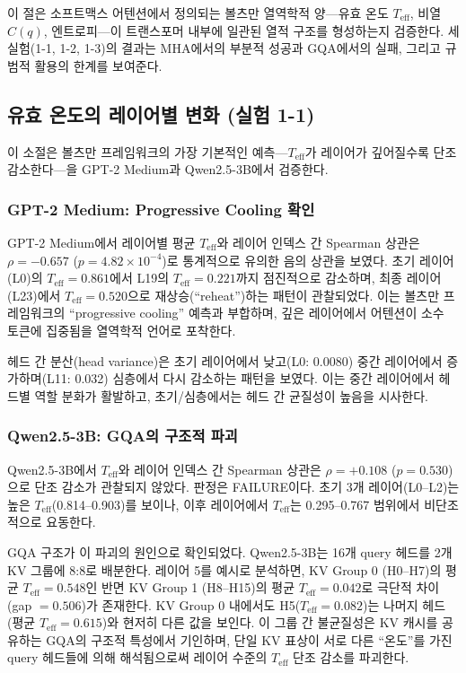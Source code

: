 \documentclass[11pt,a4paper]{article}
\newcommand{\teff}{T_\mathrm{eff}}
\newcommand{\Cq}{C(q)}
\begin{document}
이 절은 소프트맥스 어텐션에서 정의되는 볼츠만 열역학적 양---유효 온도 $\teff$, 비열 $\Cq$, 엔트로피---이 트랜스포머 내부에 일관된 열적 구조를 형성하는지 검증한다. 세 실험(1-1, 1-2, 1-3)의 결과는 MHA에서의 부분적 성공과 GQA에서의 실패, 그리고 규범적 활용의 한계를 보여준다.

\subsection{유효 온도의 레이어별 변화 (실험 1-1)}

이 소절은 볼츠만 프레임워크의 가장 기본적인 예측---$\teff$가 레이어가 깊어질수록 단조 감소한다---을 GPT-2 Medium과 Qwen2.5-3B에서 검증한다.

\subsubsection{GPT-2 Medium: Progressive Cooling 확인}

GPT-2 Medium에서 레이어별 평균 $\teff$와 레이어 인덱스 간 Spearman 상관은 $\rho = -0.657$ ($p = 4.82 \times 10^{-4}$)로 통계적으로 유의한 음의 상관을 보였다. 초기 레이어(L0)의 $\teff = 0.861$에서 L19의 $\teff = 0.221$까지 점진적으로 감소하며, 최종 레이어(L23)에서 $\teff = 0.520$으로 재상승(``reheat'')하는 패턴이 관찰되었다. 이는 볼츠만 프레임워크의 ``progressive cooling'' 예측과 부합하며, 깊은 레이어에서 어텐션이 소수 토큰에 집중됨을 열역학적 언어로 포착한다.

헤드 간 분산(head variance)은 초기 레이어에서 낮고(L0: 0.0080) 중간 레이어에서 증가하며(L11: 0.032) 심층에서 다시 감소하는 패턴을 보였다. 이는 중간 레이어에서 헤드별 역할 분화가 활발하고, 초기/심층에서는 헤드 간 균질성이 높음을 시사한다.

\subsubsection{Qwen2.5-3B: GQA의 구조적 파괴}

Qwen2.5-3B에서 $\teff$와 레이어 인덱스 간 Spearman 상관은 $\rho = +0.108$ ($p = 0.530$)으로 단조 감소가 관찰되지 않았다. 판정은 FAILURE이다. 초기 3개 레이어(L0--L2)는 높은 $\teff$(0.814--0.903)를 보이나, 이후 레이어에서 $\teff$는 0.295--0.767 범위에서 비단조적으로 요동한다.

GQA 구조가 이 파괴의 원인으로 확인되었다. Qwen2.5-3B는 16개 query 헤드를 2개 KV 그룹에 8:8로 배분한다. 레이어 5를 예시로 분석하면, KV Group 0 (H0--H7)의 평균 $\teff = 0.548$인 반면 KV Group 1 (H8--H15)의 평균 $\teff = 0.042$로 극단적 차이(gap $= 0.506$)가 존재한다. KV Group 0 내에서도 H5($\teff = 0.082$)는 나머지 헤드(평균 $\teff = 0.615$)와 현저히 다른 값을 보인다. 이 그룹 간 불균질성은 KV 캐시를 공유하는 GQA의 구조적 특성에서 기인하며, 단일 KV 표상이 서로 다른 ``온도''를 가진 query 헤드들에 의해 해석됨으로써 레이어 수준의 $\teff$ 단조 감소를 파괴한다.
\end{document}
